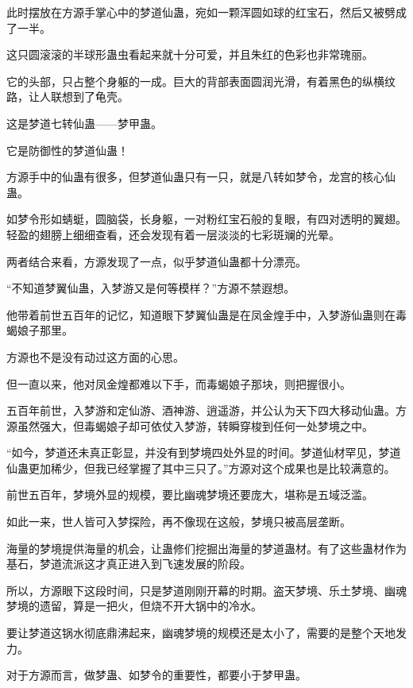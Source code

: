 
\begin{this_body}

此时摆放在方源手掌心中的梦道仙蛊，宛如一颗浑圆如球的红宝石，然后又被劈成了一半。

这只圆滚滚的半球形蛊虫看起来就十分可爱，并且朱红的色彩也非常瑰丽。

它的头部，只占整个身躯的一成。巨大的背部表面圆润光滑，有着黑色的纵横纹路，让人联想到了龟壳。

这是梦道七转仙蛊——梦甲蛊。

它是防御性的梦道仙蛊！

方源手中的仙蛊有很多，但梦道仙蛊只有一只，就是八转如梦令，龙宫的核心仙蛊。

如梦令形如蜻蜓，圆脑袋，长身躯，一对粉红宝石般的复眼，有四对透明的翼翅。轻盈的翅膀上细细查看，还会发现有着一层淡淡的七彩斑斓的光晕。

两者结合来看，方源发现了一点，似乎梦道仙蛊都十分漂亮。

“不知道梦翼仙蛊，入梦游又是何等模样？”方源不禁遐想。

他带着前世五百年的记忆，知道眼下梦翼仙蛊是在凤金煌手中，入梦游仙蛊则在毒蝎娘子那里。

方源也不是没有动过这方面的心思。

但一直以来，他对凤金煌都难以下手，而毒蝎娘子那块，则把握很小。

五百年前世，入梦游和定仙游、酒神游、逍遥游，并公认为天下四大移动仙蛊。方源虽然强大，但毒蝎娘子却可依仗入梦游，转瞬穿梭到任何一处梦境之中。

“如今，梦道还未真正彰显，并没有到梦境四处外显的时间。梦道仙材罕见，梦道仙蛊更加稀少，但我已经掌握了其中三只了。”方源对这个成果也是比较满意的。

前世五百年，梦境外显的规模，要比幽魂梦境还要庞大，堪称是五域泛滥。

如此一来，世人皆可入梦探险，再不像现在这般，梦境只被高层垄断。

海量的梦境提供海量的机会，让蛊修们挖掘出海量的梦道蛊材。有了这些蛊材作为基石，梦道流派这才真正进入到飞速发展的阶段。

所以，方源眼下这段时间，只是梦道刚刚开幕的时期。盗天梦境、乐土梦境、幽魂梦境的遗留，算是一把火，但烧不开大锅中的冷水。

要让梦道这锅水彻底鼎沸起来，幽魂梦境的规模还是太小了，需要的是整个天地发力。

对于方源而言，做梦蛊、如梦令的重要性，都要小于梦甲蛊。


\end{this_body}
